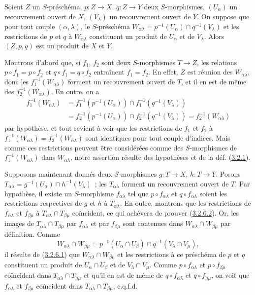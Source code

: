 \begin{lemma}[3.2.6.2]
\label{I.3.2.6.2-fr}
Soient $Z$ un $S$-préschéma, $p:Z\to X$, $q:Z\to Y$ deux $S$-morphismes,
$(U_\alpha)$ un recouvrement ouvert de $X$, $(V_\lambda)$ un recouvrement
ouvert de $Y$. On suppose que pour tout couple $(\alpha,\lambda)$, le
$S$-préschéma
$W_{\alpha\lambda}=p^{-1}(U_\alpha)\cap q^{-1}(V_\lambda)$ et les
restrictions de $p$ et $q$ à $W_{\alpha\lambda}$ constituent un produit de
$U_\alpha$ et de $V_\lambda$. Alors $(Z,p,q)$ est un produit de $X$ et $Y$.
\end{lemma}

Montrons d'abord que, si $f_1$, $f_2$ sont deux $S$-morphismes $T\to Z$, les
relations $p\circ f_1=p\circ f_2$ et $q\circ f_1=q\circ f_2$ entraînent
$f_1=f_2$. En effet, $Z$ est réunion des $W_{\alpha\lambda}$, donc les
$f_1^{-1}(W_{\alpha\lambda})$ forment un recouvrement ouvert de $T$, et il
en est de même des $f_2^{-1}(W_{\alpha\lambda})$. En outre, on a
\[
\begin{aligned}
  f_1^{-1}(W_{\alpha\lambda})
  &=f_1^{-1}(p^{-1}(U_\alpha))\cap
    f_1^{-1}(q^{-1}(V_\lambda)) \\
  &=f_2^{-1}(p^{-1}(U_\alpha))\cap
    f_2^{-1}(q^{-1}(V_\lambda))
   =f_2^{-1}(W_{\alpha\lambda})
\end{aligned}
\]
par hypothèse, et tout revient à voir que les restrictions de $f_1$ et $f_2$
à $f_1^{-1}(W_{\alpha\lambda})=f_2^{-1}(W_{\alpha\lambda})$ sont
identiques pour tout couple d'indices. Mais comme ces restrictions peuvent
être considérées comme des $S$-morphismes de
$f_1^{-1}(W_{\alpha\lambda})$ dans $W_{\alpha\lambda}$, notre assertion
résulte des hypothèses et de la déf. (\hyperref[I.3.2.1-fr]{3.2.1}).

Supposons maintenant donnés deux $S$-morphismes $g:T\to X$, $h:T\to Y$.
Posons
$T_{\alpha\lambda}=g^{-1}(U_\alpha)\cap h^{-1}(V_\lambda)$~; les
$T_{\alpha\lambda}$ forment un recouvrement ouvert de $T$. Par hypothèse,
il existe un $S$-morphisme $f_{\alpha\lambda}$ tel que
$p\circ f_{\alpha\lambda}$ et $q\circ f_{\alpha\lambda}$ soient les
restrictions respectives de $g$ et $h$ à $T_{\alpha\lambda}$. En outre,
montrons que les restrictions de $f_{\alpha\lambda}$ et
$f_{\beta\mu}$ à
$T_{\alpha\lambda}\cap T_{\beta\mu}$ coïncident, ce qui achèvera de
prouver (\hyperref[I.3.2.6.2-fr]{3.2.6.2}). Or, les images de
$T_{\alpha\lambda}\cap T_{\beta\mu}$ par $f_{\alpha\lambda}$ et par
$f_{\beta\mu}$ sont contenues dans
$W_{\alpha\lambda}\cap W_{\beta\mu}$ par définition. Comme
\[
  W_{\alpha\lambda}\cap W_{\beta\mu}
  =p^{-1}(U_\alpha\cap U_\beta)\cap
   q^{-1}(V_\lambda\cap V_\mu),
\]
il résulte de (\hyperref[I.3.2.6.1-fr]{3.2.6.1}) que
$W_{\alpha\lambda}\cap W_{\beta\mu}$ et les restrictions à ce préschéma
de $p$ et $q$ constituent un produit de
$U_\alpha\cap U_\beta$ et de $V_\lambda\cap V_\mu$. Comme
$p\circ f_{\alpha\lambda}$ et $p\circ f_{\beta\mu}$ coïncident dans
$T_{\alpha\lambda}\cap T_{\beta\mu}$ et qu'il en est de même de
$q\circ f_{\alpha\lambda}$ et $q\circ f_{\beta\mu}$, on voit que
$f_{\alpha\lambda}$ et $f_{\beta\mu}$ coïncident dans
$T_{\alpha\lambda}\cap T_{\beta\mu}$, c.q.f.d.

